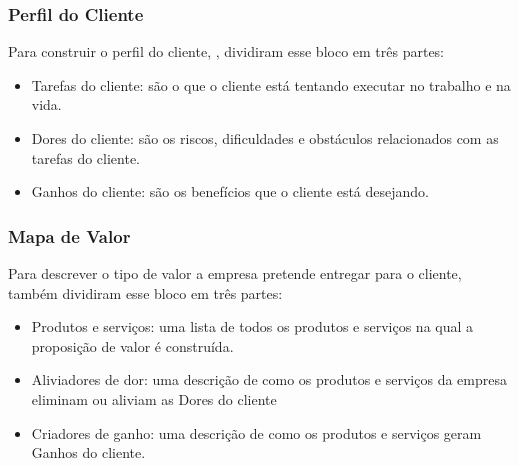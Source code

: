 \subsubsection{Perfil do Cliente}
\label{cha:perfil_do_cliente}
Para construir o perfil do cliente, , dividiram esse bloco em três partes:
\begin{itemize}
\item Tarefas do cliente: são o que o cliente está tentando executar no trabalho e na vida.
\item Dores do cliente: são os riscos, dificuldades e obstáculos relacionados com as tarefas do cliente.
\item Ganhos do cliente: são os benefícios que o cliente está desejando. \cite{valueproposition}
\end{itemize}

\subsubsection{Mapa de Valor}
\label{cha:mapa_de_valor}
Para descrever o tipo de valor a empresa pretende entregar para o cliente, também dividiram esse bloco em três partes:
\begin{itemize}
\item Produtos e serviços: uma lista de todos os produtos e serviços na qual a proposição de valor é construída.
\item Aliviadores de dor: uma descrição de como os produtos e serviços da empresa eliminam ou aliviam as Dores do cliente
\item Criadores de ganho: uma descrição de como os produtos e serviços geram Ganhos do cliente. \cite{valueproposition}
\end{itemize}

